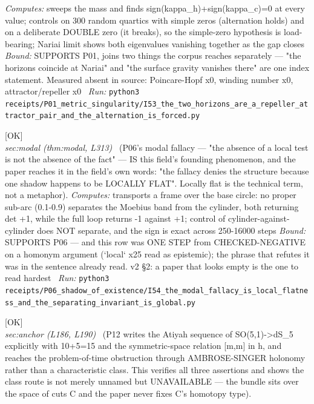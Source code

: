 \begin{description}
\emph{Computes:} sweeps the mass and finds sign(kappa\_h)+sign(kappa\_c)=0 at every value; controls on 300 random quartics with simple zeros (alternation holds) and on a deliberate DOUBLE zero (it breaks), so the simple-zero hypothesis is load-bearing; Nariai limit shows both eigenvalues vanishing together as the gap closes
 \emph{Bound:} SUPPORTS P01, joins two things the corpus reaches separately --- "the horizons coincide at Nariai" and "the surface gravity vanishes there" are one index statement. Measured absent in source: Poincare-Hopf x0, winding number x0, attractor/repeller x0
\ \emph{Run:} \texttt{python3 receipts/P01\_metric\_singularity/I53\_the\_two\_horizons\_are\_a\_repeller\_attractor\_pair\_and\_the\_alternation\_is\_forced.py}
\item[\label{rcpt:I54_the_modal_fallacy_is_local_flatness_and_the_separating_invariant_is_global}\texttt{I54\_the\_modal\_fallacy\_is\_local\_flatness\_and\_the\_separating\_invariant\_is\_global}]\hfill\textsf{[OK]}\\
\textit{sec:modal (thm:modal, L313)} \ (P06's modal fallacy --- "the absence of a local test is not the absence of the fact" --- IS this field's founding phenomenon, and the paper reaches it in the field's own words: "the fallacy denies the structure because one shadow happens to be LOCALLY FLAT". Locally flat is the technical term, not a metaphor). 
\emph{Computes:} transports a frame over the base circle: no proper sub-arc (0.1-0.9) separates the Moebius band from the cylinder, both returning det +1, while the full loop returns -1 against +1; control of cylinder-against-cylinder does NOT separate, and the sign is exact across 250-16000 steps
 \emph{Bound:} SUPPORTS P06 --- and this row was ONE STEP from CHECKED-NEGATIVE on a homonym argument (`local` x25 read as epistemic); the phrase that refutes it was in the sentence already read. v2 \S{}2: a paper that looks empty is the one to read hardest
\ \emph{Run:} \texttt{python3 receipts/P06\_shadow\_of\_existence/I54\_the\_modal\_fallacy\_is\_local\_flatness\_and\_the\_separating\_invariant\_is\_global.py}
\item[\label{rcpt:I55_the_atiyah_sequence_is_exact_and_a_characteristic_class_is_not_available}\texttt{I55\_the\_atiyah\_sequence\_is\_exact\_and\_a\_characteristic\_class\_is\_not\_available}]\hfill\textsf{[OK]}\\
\textit{sec:anchor (L186, L190)} \ (P12 writes the Atiyah sequence of SO(5,1)->dS\_5 explicitly with 10+5=15 and the symmetric-space relation [m,m] in h, and reaches the problem-of-time obstruction through AMBROSE-SINGER holonomy rather than a characteristic class. This verifies all three assertions and shows the class route is not merely unnamed but UNAVAILABLE --- the bundle sits over the space of cuts C and the paper never fixes C's homotopy type). 

\end{description}
